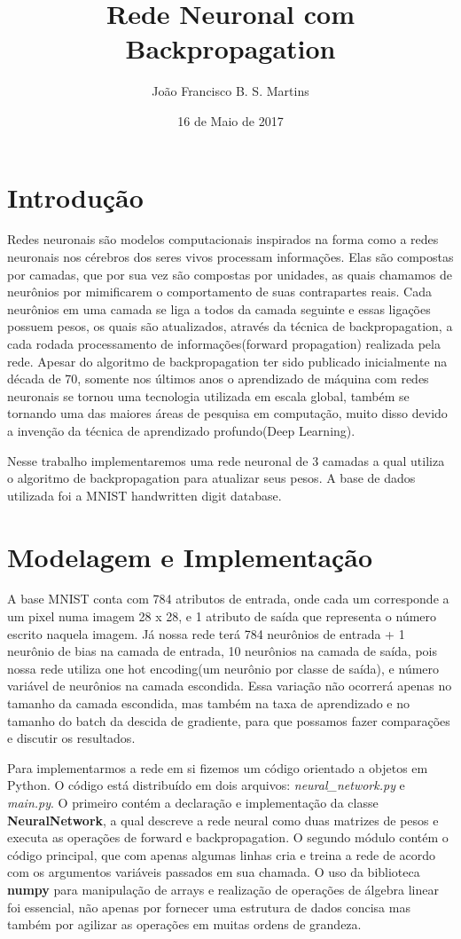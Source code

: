 \documentclass[a4paper, 11pt]{article}
\title{Rede Neuronal com Backpropagation}
\author{João Francisco B. S. Martins}
\date{16 de Maio de 2017}
\begin{document}
\maketitle
\section{Introdução}
Redes neuronais são modelos computacionais inspirados na forma como a redes neuronais nos cérebros dos seres vivos processam informações. Elas são compostas por camadas, que por sua vez são compostas por unidades, as quais chamamos de neurônios por mimificarem o comportamento de suas contrapartes reais. Cada neurônios em uma camada se liga a todos da camada seguinte e essas ligações possuem pesos, os quais são atualizados, através da técnica de backpropagation, a cada rodada processamento de informações(forward propagation) realizada pela rede. Apesar do algoritmo de backpropagation ter sido publicado inicialmente na década de 70, somente nos últimos anos o aprendizado de máquina com redes neuronais se tornou uma tecnologia utilizada em escala global, também se tornando uma das maiores áreas de pesquisa em computação, muito disso devido a invenção da técnica de aprendizado profundo(Deep Learning). 

Nesse trabalho implementaremos uma rede neuronal de 3 camadas a qual utiliza o algoritmo de backpropagation para atualizar seus pesos. A base de dados utilizada foi a MNIST handwritten digit database.

\section{Modelagem e Implementação}
A base MNIST conta com 784 atributos de entrada, onde cada um corresponde a um pixel numa imagem 28 x 28, e 1 atributo de saída que representa o número escrito naquela imagem. Já nossa rede terá 784 neurônios de entrada + 1 neurônio de bias na camada de entrada, 10 neurônios na camada de saída, pois nossa rede utiliza one hot encoding(um neurônio por classe de saída), e número variável de neurônios na camada escondida. Essa variação não ocorrerá apenas no tamanho da camada escondida, mas também na taxa de aprendizado e no tamanho do batch da descida de gradiente, para que possamos fazer comparações e discutir os resultados.

Para implementarmos a rede em si fizemos um código orientado a objetos em Python. O código está distribuído em dois arquivos: \textit{neural\_network.py} e \textit{main.py}. O primeiro contém a declaração e implementação da classe \textbf{NeuralNetwork}, a qual descreve a rede neural como duas matrizes de pesos e executa as operações de forward e backpropagation. O segundo módulo contém o código principal, que com apenas algumas linhas cria e treina a rede de acordo com os argumentos variáveis passados em sua chamada. O uso da biblioteca \textbf{numpy} para manipulação de arrays e realização de operações de álgebra linear foi essencial, não apenas por fornecer uma estrutura de dados concisa mas também por agilizar as operações em muitas ordens de grandeza.
\end{document}
